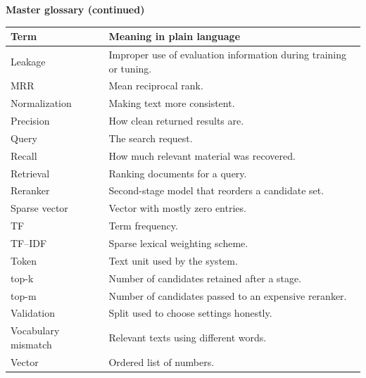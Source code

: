 \documentclass[11pt,oneside]{report}
\begin{document}
\clearpage
\begin{center}
\textbf{Master glossary (continued)}
\end{center}
\begin{longtable}{p{}p{}}
\toprule
\textbf{Term} & \textbf{Meaning in plain language} \\ \midrule
Leakage & Improper use of evaluation information during training or tuning. \\ \midrule
MRR & Mean reciprocal rank. \\ \midrule
Normalization & Making text more consistent. \\ \midrule
Precision & How clean returned results are. \\ \midrule
Query & The search request. \\ \midrule
Recall & How much relevant material was recovered. \\ \midrule
Retrieval & Ranking documents for a query. \\ \midrule
Reranker & Second-stage model that reorders a candidate set. \\ \midrule
Sparse vector & Vector with mostly zero entries. \\ \midrule
TF & Term frequency. \\ \midrule
TF--IDF & Sparse lexical weighting scheme. \\ \midrule
Token & Text unit used by the system. \\ \midrule
top-k & Number of candidates retained after a stage. \\ \midrule
top-m & Number of candidates passed to an expensive reranker. \\ \midrule
Validation & Split used to choose settings honestly. \\ \midrule
Vocabulary mismatch & Relevant texts using different words. \\ \midrule
Vector & Ordered list of numbers. \\
\bottomrule
\end{longtable}
\end{document}
